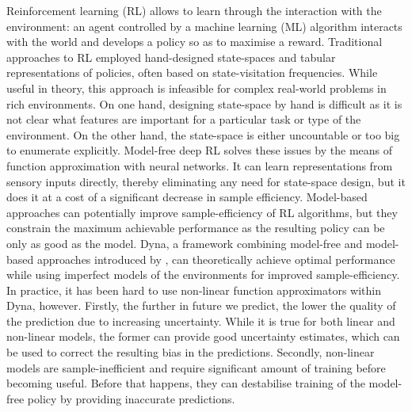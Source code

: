 %    


    Reinforcement learning (RL) allows to learn through the interaction with the environment: an agent controlled by a machine learning (ML) algorithm interacts with the world and develops a policy so as to maximise a reward. 
    Traditional approaches to RL employed hand-designed state-spaces and tabular representations of policies, often based on state-visitation frequencies.
    While useful in theory, this approach is infeasible for complex real-world problems in rich environments. 
    On one hand, designing state-space by hand is difficult as it is not clear what features are important for a particular task or type of the environment. 
    On the other hand, the state-space is either uncountable or too big to enumerate explicitly.
%    
    Model-free deep RL solves these issues by the means of function approximation with neural networks. 
    It can learn representations from sensory inputs directly, thereby eliminating any need for state-space design, but it does it at a cost of a significant decrease in sample efficiency.
    Model-based approaches can potentially improve sample-efficiency of RL algorithms, but they constrain the maximum achievable performance as the resulting policy can be only as good as the model.
    Dyna, a framework combining model-free and model-based approaches introduced by \cite{Sutton1991}, can theoretically achieve optimal performance while using imperfect models of the environments for improved sample-efficiency.
    In practice, it has been hard to use non-linear function approximators within Dyna, however.
    Firstly, the further in future we predict, the lower the quality of the prediction due to increasing uncertainty. 
    While it is true for both linear and non-linear models, the former can provide good uncertainty estimates, which can be used to correct the resulting bias in the predictions. 
    Secondly, non-linear models are sample-inefficient and require significant amount of training before becoming useful. 
    Before that happens, they can destabilise training of the model-free policy by providing inaccurate predictions.

